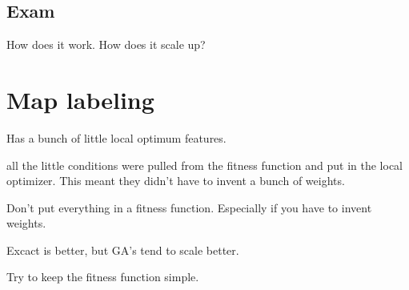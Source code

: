 \documentclass{article}
\begin{document}
\subsection{Exam}
How does it work. How does it scale up?

\section{Map labeling}
Has a bunch of little local optimum features.

all the little conditions were pulled from the fitness function
and put in the local optimizer. This meant they didn't have to
invent a bunch of weights.

Don't put everything in a fitness function. Especially if you have
to invent weights.

Excact is better, but GA's tend to scale better.


Try to keep the fitness function simple.
\end{document}
